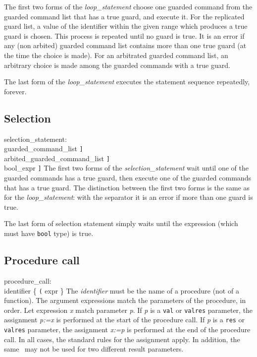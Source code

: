 The first two forms of the {\it{}loop\_statement} choose one guarded command
from the guarded command list that has a true guard, and execute it.
For the replicated guard list, a value of the identifier within the given range
which produces a true guard is chosen.
This process is repeated until no guard is true. 
It is an error if any (non arbited) guarded command list contains more
than one true guard (at the time the choice is made). 
For an arbitrated guarded command list, an
arbitrary choice is made among the guarded commands with a true guard.

The last form of the {\it{}loop\_statement} executes the statement
sequence repeatedly, forever.

\subsection{Selection}\label{sec:select}

\grammarstart
selection\_statement: \\
       \>{\tt{}[} guarded\_command\_list {\tt{}]} \\
\orbox \>{\tt{}[} arbited\_guarded\_command\_list {\tt{}]} \\
\orbox \>{\tt{}[} bool\_expr {\tt{}]}
\grammarend
The first two forms of the {\it{}selection\_statement} wait until one of the
guarded commands has a true guard, then execute one of the guarded
commands that has a true guard. The distinction between the first two
forms is the same as for the {\it{}loop\_statement}: with the {\tt{}\orbox} separator
it is an error if more than one guard is true.

The last form of selection statement simply waits until the expression
(which must have {\tt{}bool} type) is true.


\subsection{Procedure call}\label{sec:proccall}

\grammarstart
procedure\_call: \\
      \>identifier \{ {\tt{}(} expr\LISTOPT {\tt{})} \}\OPT
\grammarend
The {\it{}identifier} must be the name of a procedure (not of a function).
The argument expressions match the parameters of the procedure,
in order. Let expression {\it{}x} match parameter {\it{}p}. If {\it{}p} is a {\tt{}val}
or {\tt{}valres} parameter, the assignment {\it{}p:=x} is performed at
the start of the procedure call. If {\it{}p} is a {\tt{}res} or {\tt{}valres}
parameter, the assignment {\it{}x:=p} is performed at the end of the
procedure call. In all cases, the standard rules for the assignment
apply. In addition, the same \lvalue\ may not be used for two different
result parameters.

